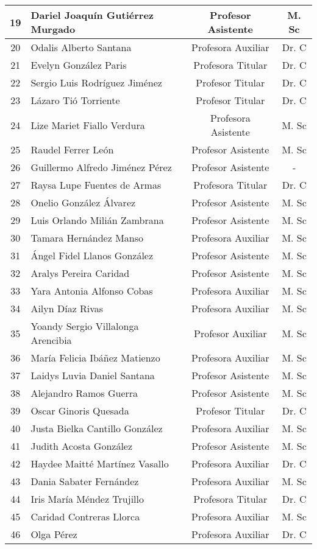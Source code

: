 \begin{longtable}{|c|p{7cm}|c|c|}
\\ \hline
	19 & Dariel Joaquín Gutiérrez Murgado & Profesor Asistente & M. Sc
\\ \hline
	20 & Odalis Alberto Santana & Profesora Auxiliar & Dr. C
\\ \hline
	21 & Evelyn González Paris & Profesora Titular & Dr. C
\\ \hline
	22 & Sergio Luis Rodríguez Jiménez & Profesor Titular & Dr. C
\\ \hline
	23 & Lázaro Tió Torriente & Profesor Titular & Dr. C
\\ \hline
	24 & Lize Mariet Fiallo Verdura & Profesora Asistente & M. Sc
\\ \hline
	25 & Raudel Ferrer León & Profesor Asistente & M. Sc
\\ \hline
	26 & Guillermo Alfredo Jiménez Pérez & Profesor Asistente & -
\\ \hline
	27 & Raysa Lupe Fuentes de Armas & Profesora Titular & Dr. C
\\ \hline
	28 & Onelio González Álvarez & Profesor Asistente & M. Sc
\\ \hline
	29 & Luis Orlando Milián Zambrana & Profesor Asistente & M. Sc
\\ \hline
	30 & Tamara Hernández Manso & Profesora Auxiliar & M. Sc
\\ \hline
	31 & Ángel Fidel Llanos González & Profesor Asistente & M. Sc
\\ \hline
	32 & Aralys Pereira Caridad & Profesor Asistente & M. Sc
\\ \hline
	33 & Yara Antonia Alfonso Cobas & Profesora Auxiliar & M. Sc
\\ \hline
	34 & Ailyn Díaz Rivas & Profesora Auxiliar & M. Sc
\\ \hline
	35 & Yoandy Sergio Villalonga Arencibia & Profesor Auxiliar & M. Sc
\\ \hline
	36 & María Felicia Ibáñez Matienzo & Profesora Auxiliar & M. Sc
\\ \hline
	37 & Laidys Luvia Daniel Santana & Profesor Asistente & M. Sc
\\ \hline
	38 & Alejandro Ramos Guerra & Profesor Asistente & M. Sc
\\ \hline
	39 & Oscar Ginoris Quesada & Profesor Titular & Dr. C
\\ \hline
	40 & Justa Bielka Cantillo González & Profesora Auxiliar & M. Sc
\\ \hline
	41 & Judith Acosta González & Profesor Asistente & M. Sc
\\ \hline
	42 & Haydee Maitté Martínez Vasallo & Profesora Auxiliar & Dr. C
\\ \hline
	43 & Dania Sabater Fernández & Profesora Auxiliar & M. Sc
\\ \hline
	44 & Iris María Méndez Trujillo & Profesora Titular & Dr. C
\\ \hline
	45 & Caridad Contreras Llorca & Profesora Auxiliar & M. Sc
\\ \hline
	46 & Olga Pérez & Profesora Auxiliar & Dr. C \\ \hline
\end{longtable}